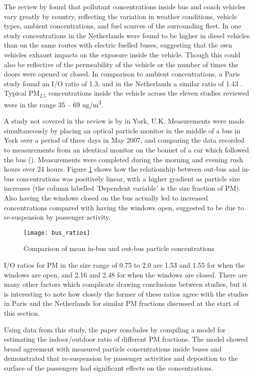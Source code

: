 The review by \cite{Karanasiou2014} found that pollutant concentrations inside bus and coach vehicles vary greatly by country, reflecting the variation in weather conditions, vehicle types, ambient concentrations, and fuel sources of the surrounding fleet. In one study concentrations in the Netherlands were found to be higher in diesel vehicles than on the same routes with electric fuelled buses, suggesting that the own vehicles exhaust impacts on the exposure inside the vehicle. Though this could also be reflective of the permeability of the vehicle or the number of times the doors were opened or closed. In comparison to ambient concentrations, a Paris study found an I/O ratio of 1.3, and in the Netherlands a similar ratio of 1.43 . Typical PM$_{2.5}$ concentrations inside the vehicle across the eleven studies reviewed were in the range 35 -- 69 ug/m\textsuperscript{3}.

A study not covered in the review is by \cite{Song2009} in York, U.K. Measurements were made simultaneously by placing an optical particle monitor in the middle of a bus in York over a period of three days in May 2007, and comparing the data recorded to measurements from an identical monitor on the bonnet of a car which followed the bus (\cite{Song2009}). Measurements were completed during the morning and evening rush hours over 24 hours. Figure \ref{fig:bus_ratios} shows how the relationship between out-bus and in-bus concentrations was positively linear, with a higher gradient as particle size increases (the column labelled 'Dependent variable' is the size fraction of PM). Also having the windows closed on the bus actually led to increased concentrations compared with having the windows open, suggested to be due to re-suspension by passenger activity. 

\begin{figure}[H]
\centering
\texttt{[image: bus\_ratios]}
\caption{Comparison of mean in-bus and out-bus particle concentrations}
\label{fig:bus_ratios}
\end{figure}

I/O ratios for PM in the size range of 0.75 to 2.0 are 1.53 and 1.55 for when the windows are open, and 2.16 and 2.48 for when the windows are closed. There are many other factors which complicate drawing conclusions between studies, but it is interesting to note how closely the former of these ratios agree with the studies in Paris and the Netherlands for similar PM fractions discussed at the start of this section. 

Using data from this study, the \cite{Song2009} paper concludes by compiling a model for estimating the indoor/outdoor ratio of different PM fractions. The model showed broad agreement with measured particle concentrations inside buses and demonstrated that re-suspension by passenger activities and deposition to the surface of the passengers had significant effects on the concentrations.

